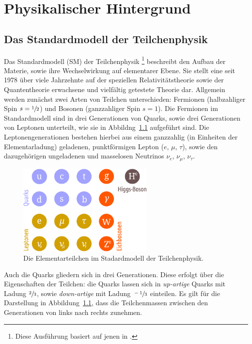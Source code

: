 \chapter{Physikalischer Hintergrund}
\label{chap:2}
%
\section{Das Standardmodell der Teilchenphysik}
%
Das Standardmodell (SM) der Teilchenphysik \footnote{Diese Ausführung basiert auf jenen in  \cite{griffiths, HalzenMartin}.}
beschreibt den Aufbau der Materie, sowie ihre Wechselwirkung auf elementarer Ebene. Sie stellt eine seit 1978
\cite{griffiths} über viele Jahrzehnte auf der speziellen Relativitätstheorie sowie der Quantentheorie erwachsene
und vielfältig getestete Theorie dar. Allgemein werden zunächst zwei Arten von Teilchen unterschieden: Fermionen
(halbzahliger Spin $s=\sfrac{1}{2}$) und Bosonen (ganzzahliger Spin $s=1$). Die Fermionen im Standardmodell sind
in drei Generationen von Quarks, sowie drei Generationen von Leptonen unterteilt, wie sie in Abbildng~\ref{fig:particles}
aufgeführt sind. Die Leptonengenerationen bestehen hierbei aus einem ganzzahlig (in Einheiten der Elementarladung)
geladenen, punktförmigen Lepton ($e$, $\mu$, $\tau$), sowie den dazugehörigen ungeladenen und masselosen
Neutrinos $\nu_e$, $\nu_\mu$, $\nu_\tau$.
%
\begin{figure}
  \centering
      \includegraphics[width=0.6\textwidth]{Plots/SM.pdf}
  \caption{Die Elementarteilchen im Stadardmodell der Teilchenphysik.}
  \label{fig:particles}
\end{figure}
%
Auch die Quarks gliedern sich in drei Generationen. Diese erfolgt über die Eigenschaften der Teilchen: die Quarks
lassen sich in \textit{up-artige} Quarks mit Ladung $\sfrac{2}{3}$, sowie \textit{down-artige} mit Ladung
$\sfrac{-1}{3}$ einteilen. Es gilt für die Darstellung in Abbildung~\ref{fig:particles}, dass die Teilchenmassen
zwischen den Generationen von links nach rechts zunehmen.\\
